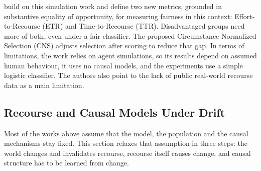 \citet{bell2025much} build on this simulation work and define two new metrics, grounded in substantive equality
of opportunity, for measuring fairness in this context: Effort-to-Recourse (ETR) and Time-to-Recourse (TTR).
Disadvantaged groups need more of both, even under a fair classifier. The proposed Circumstance-Normalized
Selection (CNS) adjusts selection after scoring to reduce that gap. In terms of limitations, the work relies
on agent simulations, so its results depend on assumed human behaviour, it uses no causal models, and the
experiments use a simple logistic classifier. The authors also point to the lack of public real-world
recourse data as a main limitation.

\subsection{Recourse and Causal Models Under Drift}
\label{sec:lr-drift}
Most of the works above assume that the model, the population and the causal mechanisms stay fixed. This
section relaxes that assumption in three steps: the world changes and invalidates recourse, recourse itself
causes change, and causal structure has to be learned from change.

